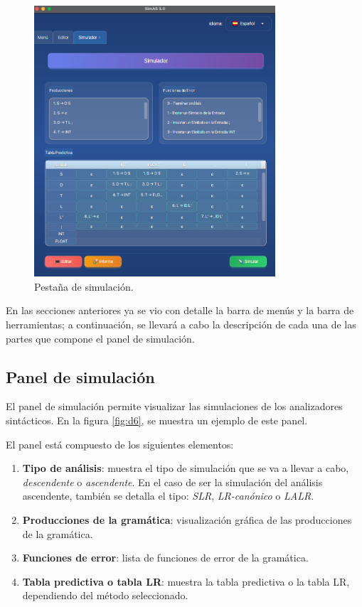 \begin{figure}[htp]
\centering
	\includegraphics[width=0.8\textwidth]{figuras2/ejemplo_practico/simulador.png}
	\caption{Pestaña de simulación.}
	\label{fig:d5}
\end{figure}

  En las secciones anteriores ya se vio con detalle la barra de menús y la barra de herramientas; a continuación, se llevará a cabo la descripción de cada una de las partes que compone el panel de simulación.



\subsection{Panel de simulación}

El panel de simulación permite visualizar las simulaciones de los analizadores sintácticos. En la figura \ref{fig:d6}, se muestra un ejemplo de este panel.

El panel está compuesto de los siguientes elementos:
\begin{enumerate}
 \item \textbf{Tipo de análisis}: muestra el tipo de simulación que se va a llevar a cabo, \textit{descendente} o \textit{ascendente}. En el caso de ser la simulación del análisis ascendente, también se detalla el tipo: \textit{SLR}, \textit{LR-canónico} o \textit{LALR}.
 \item \textbf{Producciones de la gramática}: visualización gráfica de las producciones de la gramática.
 \item \textbf{Funciones de error}: lista de funciones de error de la gramática.
 \item \textbf{Tabla predictiva o tabla LR}: muestra la tabla predictiva o la tabla LR, dependiendo del método seleccionado.
\end{enumerate}

